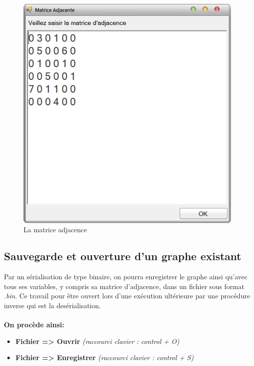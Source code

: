 \documentclass[11pt,twoside,a4paper]{article}
\begin{document}
\paragraph{}
\begin{figure}[!h]
\begin{center}
\includegraphics{matrice.png}
\caption{La matrice adjacence}
\end{center}
\end{figure}

\subsection{Sauvegarde et ouverture d’un graphe existant}
Par un sérialisation de type binaire, on pourra enregistrer le graphe ainsi qu'avec tous ses variables, y compris sa matrice d’adjacence, dans un fichier sous format \textit{.bin}. Ce travail pour être ouvert lors d’une exécution ultérieure par une procédure inverse qui est la desérialisation.
\paragraph{}

{\bf On procède ainsi:}
\begin{itemize}
\item \textbf{Fichier => Ouvrir} \textit{ (raccourci clavier : control + O)}
\item \textbf{Fichier => Enregistrer} \textit{  (raccourci clavier : control + S)}
 \end{itemize}
\end{document}
